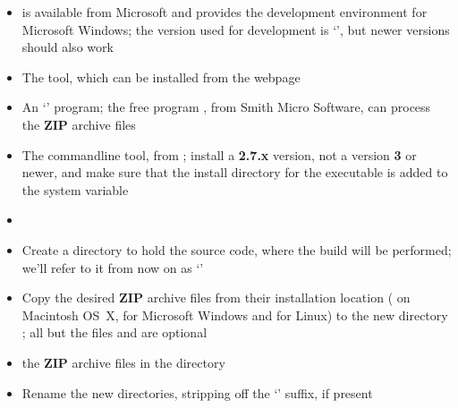 \begin{itemize}
\item{} is available from Microsoft and provides the 
development environment for Microsoft Windows; the version used for development is
`', but newer versions should also work
\item\exSp{} The  tool, which can be installed from the web\longDash{}page
\item\exSp{} An `' program; the free program , from
%
{Smith Micro Software}, can process the \textbf{ZIP} archive files
\item\exSp{} The  command\longDash{}line tool, from
; install a \textbf{2.7.x}
version, not a version \textbf{3} or newer, and make sure that the install directory for
the executable is added to the system  variable
\end{itemize}
\tertiaryEnd{}
\begin{itemize}
\item\TBD{}
\end{itemize}
\tertiaryEnd{}
\secondaryEnd{}
\begin{itemize}
\item Create a directory to hold the source code, where the build will be performed; we'll
refer to it from now on as `'
\item\exSp{} Copy the desired \textbf{ZIP} archive files from their installation location
( on Macintosh OS~X, \TBD{} for Microsoft Windows and \TBD{} for
Linux) to the new directory ; all but the files
 and  are optional
\item\exSp{} the \textbf{ZIP} archive files in the directory 
\item\exSp{} Rename the new directories, stripping off the `' suffix, if
present
\end{itemize}
